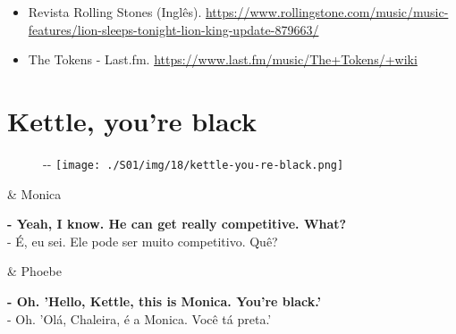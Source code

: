 \begin{itemize}
\tightlist
\item
  \sloppy Revista Rolling Stones (Inglês). \url{https://www.rollingstone.com/music/music-features/lion-sleeps-tonight-lion-king-update-879663/}
\item
  \sloppy The Tokens - Last.fm. \url{https://www.last.fm/music/The+Tokens/+wiki}
\end{itemize}

\hypertarget{kettle-youre-black}{%
\section{Kettle, you're black}\label{kettle-youre-black}}

\begin{figure}[!ht]
  \begin{adjustwidth}{-\oddsidemargin-1in}{-\rightmargin}
    \centering
    \texttt{[image: ./S01/img/18/kettle-you-re-black.png]}
  \end{adjustwidth}
\end{figure}

\begin{tcolorbox}[enhanced,center upper,
    drop fuzzy shadow southeast, boxrule=0.3pt,
    lower separated=false, breakable,
    colframe=black!30!dialogoBorder,colback=white]
\begin{minipage}[c]{0.16\linewidth}
   & \centering \scriptsize{Monica}
\end{minipage}
\hfill
\begin{minipage}[c]{0.8\linewidth}
  \textbf{- Yeah, I know. He can get really competitive. What?}\\
  - É, eu sei. Ele pode ser muito competitivo. Quê?
\end{minipage}

\medskip
\begin{minipage}[c]{0.16\linewidth}
   & \centering \scriptsize{Phoebe}
\end{minipage}
\hfill
\begin{minipage}[c]{0.8\linewidth}
  \textbf{- Oh. 'Hello, Kettle, this is Monica. You're black.'}\\
  - Oh. 'Olá, Chaleira, é a Monica. Você tá preta.'
\end{minipage}
\end{tcolorbox}

